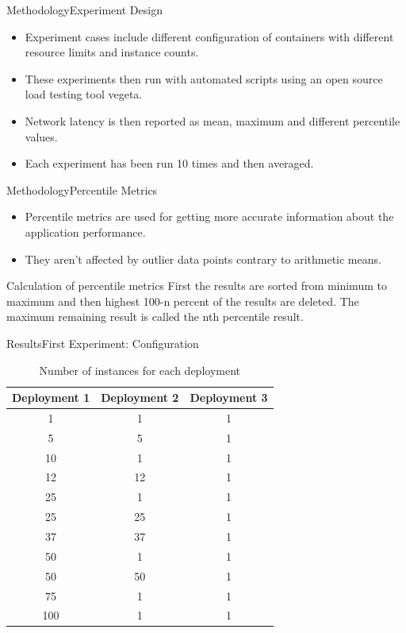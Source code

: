 \documentclass{beamer}
\begin{document}
\begin{frame}{Methodology}{Experiment Design}
 \begin{itemize}
  \item Experiment cases include different configuration of containers with different
  resource limits and instance counts.
  \item These experiments then run with automated scripts using an open source load testing tool vegeta.
  \item Network latency is then reported as mean, maximum and different percentile values.
  \item Each experiment has been run 10 times and then averaged.
 \end{itemize}
\end{frame}

\begin{frame}{Methodology}{Percentile Metrics}
 \begin{itemize}
  \item Percentile metrics are used for getting more accurate information about the application performance.
  \item They aren't affected by outlier data points contrary to arithmetic means.
 \end{itemize}
 \begin{block}{Calculation of percentile metrics}
  First the results are sorted from minimum to maximum and then highest 100-n percent of the results are deleted.
  The maximum remaining result is called the nth percentile result.
 \end{block}
\end{frame}

\begin{frame}{Results}{First Experiment: Configuration}
  \begin{table}[h]
    \caption{Number of instances for each deployment}
    \centering
    \begin{tabular}{ccc}
    Deployment 1 & Deployment 2 & Deployment 3 \\
    \hline
    1 & 1 & 1 \\
    5 & 5 & 1 \\
    10 & 1 & 1 \\
    12 & 12 & 1 \\
    25 & 1 & 1 \\
    25 & 25 & 1 \\
    37 & 37 & 1 \\
    50 & 1 & 1 \\
    50 & 50 & 1 \\
    75 & 1 & 1 \\
    100 & 1 & 1 \\
    \hline
    \end{tabular}
  \end{table}
\end{frame}
\end{document}
